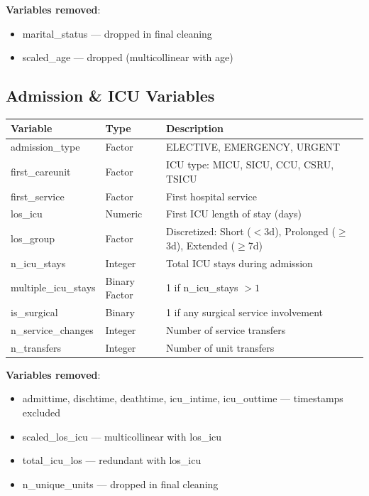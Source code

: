 \documentclass[11pt]{article}
\begin{document}
\textbf{Variables removed}:
\begin{itemize}[leftmargin=*, nosep]
    \item marital\_status --- dropped in final cleaning
    \item scaled\_age --- dropped (multicollinear with age)
\end{itemize}

\subsection{Admission \& ICU Variables}

\begin{longtable}{L{3.5cm}L{2cm}L{8.5cm}}
\toprule
\textbf{Variable} & \textbf{Type} & \textbf{Description} \\
\midrule
\endhead
admission\_type & Factor & ELECTIVE, EMERGENCY, URGENT \\
first\_careunit & Factor & ICU type: MICU, SICU, CCU, CSRU, TSICU \\
first\_service & Factor & First hospital service \\
los\_icu & Numeric & First ICU length of stay (days) \\
los\_group & Factor & Discretized: Short ($<$3d), Prolonged ($\geq$3d), Extended ($\geq$7d) \\
n\_icu\_stays & Integer & Total ICU stays during admission \\
multiple\_icu\_stays & Binary Factor & 1 if n\_icu\_stays $>1$ \\
is\_surgical & Binary & 1 if any surgical service involvement \\
n\_service\_changes & Integer & Number of service transfers \\
n\_transfers & Integer & Number of unit transfers \\
\bottomrule
\end{longtable}

\textbf{Variables removed}:
\begin{itemize}[leftmargin=*, nosep]
    \item admittime, dischtime, deathtime, icu\_intime, icu\_outtime --- timestamps excluded
    \item scaled\_los\_icu --- multicollinear with los\_icu
    \item total\_icu\_los --- redundant with los\_icu
    \item n\_unique\_units --- dropped in final cleaning
\end{itemize}
\end{document}
